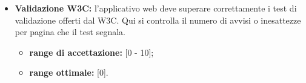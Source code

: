 \begin{itemize}
				\item \textbf{Validazione W3C:} l'applicativo web deve superare correttamente i test di validazione offerti dal W3C. Qui si controlla il numero di avvisi o inesattezze per pagina che il test segnala.
				\begin{itemize}
					\item \textbf{range di accettazione:} [0 - 10];
					\item \textbf{range ottimale:} [0].
				\end{itemize}				
				
			\end{itemize}
			

	\pagebreak

